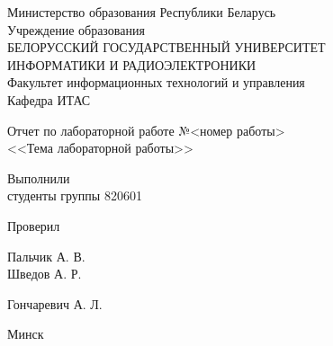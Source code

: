 \begin{titlepage}
\thispagestyle{empty}
\setlength{\parindent}{0ex} %

\begin{center}
  Министерство образования Республики Беларусь \\
  \vspace{0.5ex}
  Учреждение образования \\
  БЕЛОРУССКИЙ ГОСУДАРСТВЕННЫЙ УНИВЕРСИТЕТ \\
  ИНФОРМАТИКИ И РАДИОЭЛЕКТРОНИКИ \\
  \vspace{0.5ex}
  Факультет информационных технологий и управления \\
  \vspace{0.5ex}
  Кафедра ИТАС
\end{center}

\vspace{50mm}

\begin{center}
  Отчет по лабораторной работе №<номер работы> \\
  <<Тема лабораторной работы>>
\end{center}

\vspace{50mm}

\begin{minipage}{.55\linewidth}
    Выполнили\\
    студенты группы 820601

    \smallskip

    Проверил
\end{minipage}
\hfill
\begin{minipage}{.4\linewidth}
  \begin{flushright}
    Пальчик А. В.\\
    Шведов А. Р.

    \smallskip

    Гончаревич А. Л.
  \end{flushright}
\end{minipage}

\vfill
\begin{center}
  Минск \the\year{}
\end{center}

\setlength{\parindent}{1.25cm} %
\end{titlepage}
